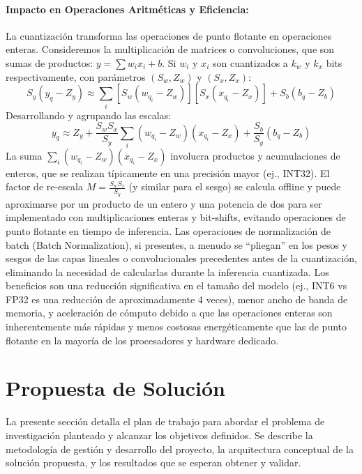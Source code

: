 \documentclass[12pt]{article}
\begin{document}
\paragraph{Impacto en Operaciones Aritméticas y Eficiencia:}
La cuantización transforma las operaciones de punto flotante en operaciones enteras. Consideremos la multiplicación de matrices o convoluciones, que son sumas de productos: $y = \sum w_i x_i + b$. Si $w_i$ y $x_i$ son cuantizados a $k_w$ y $k_x$ bits respectivamente, con parámetros $(S_w, Z_w)$ y $(S_x, Z_x)$:
\begin{equation}
S_y (y_q - Z_y) \approx \sum_i [S_w (w_{q_i} - Z_w)] [S_x (x_{q_i} - Z_x)] + S_b (b_q - Z_b)
\end{equation}
Desarrollando y agrupando las escalas:
\begin{equation}
y_q \approx Z_y + \frac{S_w S_x}{S_y} \sum_i (w_{q_i} - Z_w)(x_{q_i} - Z_x) + \frac{S_b}{S_y} (b_q - Z_b)
\label{eq:quantized_mac_full}
\end{equation}
La suma $\sum_i (w_{q_i} - Z_w)(x_{q_i} - Z_x)$ involucra productos y acumulaciones de enteros, que se realizan típicamente en una precisión mayor (ej., INT32). El factor de re-escala $M = \frac{S_w S_x}{S_y}$ (y similar para el sesgo) se calcula offline y puede aproximarse por un producto de un entero y una potencia de dos para ser implementado con multiplicaciones enteras y bit-shifts, evitando operaciones de punto flotante en tiempo de inferencia. Las operaciones de normalización de batch (Batch Normalization), si presentes, a menudo se ``pliegan'' en los pesos y sesgos de las capas lineales o convolucionales precedentes antes de la cuantización, eliminando la necesidad de calcularlas durante la inferencia cuantizada.
Los beneficios son una reducción significativa en el tamaño del modelo (ej., INT6 vs FP32 es una reducción de aproximadamente 4 veces), menor ancho de banda de memoria, y aceleración de cómputo debido a que las operaciones enteras son inherentemente más rápidas y menos costosas energéticamente que las de punto flotante en la mayoría de los procesadores y hardware dedicado.


\section{Propuesta de Solución}
\label{sec:propuesta_solucion}

La presente sección detalla el plan de trabajo para abordar el problema de investigación planteado y alcanzar los objetivos definidos. Se describe la metodología de gestión y desarrollo del proyecto, la arquitectura conceptual de la solución propuesta, y los resultados que se esperan obtener y validar.
\end{document}
